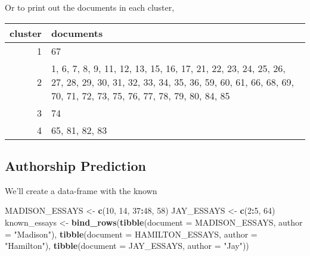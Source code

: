 \documentclass[]{book}
\newenvironment{Shaded}{\begin{snugshade}}{\end{snugshade}}
\newcommand{\KeywordTok}[1]{\textcolor[rgb]{0.13,0.29,0.53}{\textbf{#1}}}
\newcommand{\DataTypeTok}[1]{\textcolor[rgb]{0.13,0.29,0.53}{#1}}
\newcommand{\DecValTok}[1]{\textcolor[rgb]{0.00,0.00,0.81}{#1}}
\newcommand{\StringTok}[1]{\textcolor[rgb]{0.31,0.60,0.02}{#1}}
\newcommand{\OperatorTok}[1]{\textcolor[rgb]{0.81,0.36,0.00}{\textbf{#1}}}
\newcommand{\NormalTok}[1]{#1}
\theoremstyle{definition}
\theoremstyle{definition}
\theoremstyle{definition}
\theoremstyle{remark}
\begin{document}
Or to print out the documents in each cluster,

\begin{Shaded}
\end{Shaded}

\begin{tabular}{r|l}
\hline
cluster & documents\\
\hline
1 & 67\\
\hline
2 & 1, 6, 7, 8, 9, 11, 12, 13, 15, 16, 17, 21, 22, 23, 24, 25, 26, 27, 28, 29, 30, 31, 32, 33, 34, 35, 36, 59, 60, 61, 66, 68, 69, 70, 71, 72, 73, 75, 76, 77, 78, 79, 80, 84, 85\\
\hline
3 & 74\\
\hline
4 & 65, 81, 82, 83\\
\hline
\end{tabular}

\subsection{Authorship Prediction}\label{authorship-prediction}

We'll create a data-frame with the known

\begin{Shaded}
\begin{Highlighting}[]
\NormalTok{MADISON_ESSAYS <-}\StringTok{ }\KeywordTok{c}\NormalTok{(}\DecValTok{10}\NormalTok{, }\DecValTok{14}\NormalTok{, }\DecValTok{37}\OperatorTok{:}\DecValTok{48}\NormalTok{, }\DecValTok{58}\NormalTok{)}
\NormalTok{JAY_ESSAYS <-}\StringTok{ }\KeywordTok{c}\NormalTok{(}\DecValTok{2}\OperatorTok{:}\DecValTok{5}\NormalTok{, }\DecValTok{64}\NormalTok{)}
\NormalTok{known_essays <-}\StringTok{ }\KeywordTok{bind_rows}\NormalTok{(}\KeywordTok{tibble}\NormalTok{(}\DataTypeTok{document =}\NormalTok{ MADISON_ESSAYS,}
                                 \DataTypeTok{author =} \StringTok{"Madison"}\NormalTok{),}
                          \KeywordTok{tibble}\NormalTok{(}\DataTypeTok{document =}\NormalTok{ HAMILTON_ESSAYS,}
                                 \DataTypeTok{author =} \StringTok{"Hamilton"}\NormalTok{),}
                          \KeywordTok{tibble}\NormalTok{(}\DataTypeTok{document =}\NormalTok{ JAY_ESSAYS,}
                                 \DataTypeTok{author =} \StringTok{"Jay"}\NormalTok{))}
\end{Highlighting}
\end{Shaded}
\end{document}
